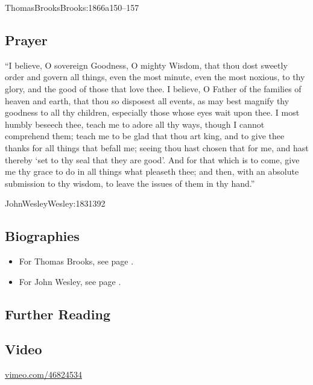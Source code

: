 \documentclass[00-main.tex]{subfiles}
\begin{document}
\begin{NameCite}
{Thomas}{Brooks}{Brooks:1866a}{150--157}
\end{NameCite}

\subsection{Prayer}
``I believe, O sovereign Goodness, O mighty Wisdom, that thou dost sweetly order and govern all things, even the most minute, even the most noxious, to thy glory, and the good of those that love thee. I believe, O Father of the families of heaven and earth, that thou so disposest all events, as may best magnify thy goodness to all thy children, especially those whose eyes wait upon thee. I most humbly beseech thee, teach me to adore all thy ways, though I cannot comprehend them; teach me to be glad that thou art king, and to give thee thanks for all things that befall me; seeing thou hast chosen that for me, and hast thereby `set to thy seal that they are good'. And for that which is to come, give me thy grace to do in all things what pleaseth thee; and then, with an absolute submission to thy wisdom, to leave the issues of them in thy hand.''

\begin{NameCite}
{John}{Wesley}{Wesley:1831}{392}
\end{NameCite}

\begin{multicols*}{2}
\subsection{Biographies}

\begin{itemize}
	\item For Thomas Brooks, see page \pageref{brooks}.
	\item For John Wesley, see page \pageref{wesley}.
\end{itemize}

\subsection{Further Reading}

\subsection{Video}
\href{https://vimeo.com/46824534}{vimeo.com\slash{}46824534}
\end{multicols*}
\end{document}

